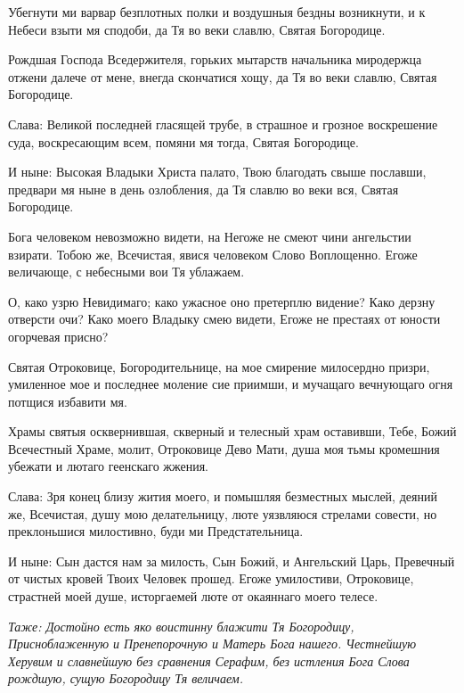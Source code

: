 Убегнути ми варвар безплотных полки и воздушныя бездны возникнути, и к Небеси взыти мя сподоби, да Тя во веки славлю, Святая Богородице. 

Рождшая Господа Вседержителя, горьких мытарств начальника миродержца отжени далече от мене, внегда скончатися хощу, да Тя во веки славлю, Святая Богородице. 

Слава: Великой последней гласящей трубе, в страшное и грозное воскрешение суда, воскресающим всем, помяни мя тогда, Святая Богородице. 

И ныне: Высокая Владыки Христа палато, Твою благодать свыше пославши, предвари мя ныне в день озлобления, да Тя славлю во веки вся, Святая Богородице.




Бога человеком невозможно видети, на Негоже не смеют чини ангельстии взирати. Тобою же, Всечистая, явися человеком Слово Воплощенно. Егоже величающе, с небесными вои Тя ублажаем. 

О, како узрю Невидимаго; како ужасное оно претерплю видение? Како дерзну отверсти очи? Како моего Владыку смею видети, Егоже не престаях от юности огорчевая присно? 

Святая Отроковице, Богородительнице, на мое смирение милосердно призри, умиленное мое и последнее моление сие приимши, и мучащаго вечнующаго огня потщися избавити мя. 

Храмы святыя осквернившая, скверный и телесный храм оставивши, Тебе, Божий Всечестный Храме, молит, Отроковице Дево Мати, душа моя тьмы кромешния убежати и лютаго геенскаго жжения. 

Слава: Зря конец близу жития моего, и помышляя безместных мыслей, деяний же, Всечистая, душу мою делательницу, люте уязвляюся стрелами совести, но преклоньшися милостивно, буди ми Предстательница. 

И ныне: Сын дастся нам за милость, Сын Божий, и Ангельский Царь, Превечный от чистых кровей Твоих Человек прошед. Егоже умилостиви, Отроковице, страстней моей душе, исторгаемей люте от окаяннаго моего телесе. 

\itshape Таже\normalfont{}: Достойно есть яко воистинну блажити Тя Богородицу, Присноблаженную и Пренепорочную и Матерь Бога нашего. Честнейшую Херувим и славнейшую без сравнения Серафим, без истления Бога Слова рождшую, сущую Богородицу Тя величаем.




